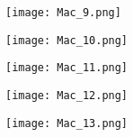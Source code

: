 \documentclass[../resumosRCOM.tex]{subfiles}
\begin{document}
\begin{figure}[H]
    \centering
    \texttt{[image: Mac\_9.png]}
\end{figure}

\begin{figure}[H]
    \centering
    \texttt{[image: Mac\_10.png]}
\end{figure}

\begin{figure}[H]
    \centering
    \texttt{[image: Mac\_11.png]}
\end{figure}

\begin{figure}[H]
    \centering
    \texttt{[image: Mac\_12.png]}
\end{figure}

\begin{figure}[H]
    \centering
    \texttt{[image: Mac\_13.png]}
\end{figure}
\end{document}
